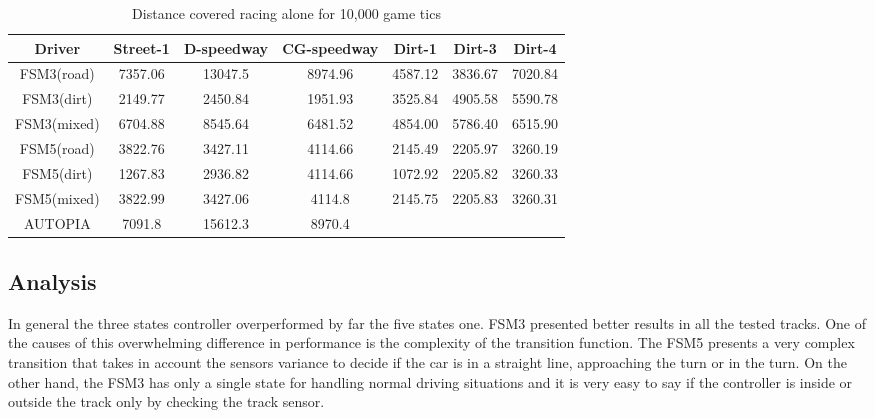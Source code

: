 	\begin{table}[h]
	\renewcommand{\arraystretch}{1.3}
	\caption{Distance covered racing alone for 10,000 game tics}
	\label{tbl:dist covered}
	\centering
	\begin{tabular}{c||c||c||c||c||c||c}
	\hline
	\bfseries Driver & \bfseries Street-1 & \bfseries D-speedway & \bfseries CG-speedway & \bfseries Dirt-1 & \bfseries Dirt-3 & \bfseries Dirt-4 \\ 
	\hline
	\hline FSM3(road) & 7357.06	& 13047.5 & 8974.96 & 4587.12 & 3836.67 & 7020.84 \\
	\hline FSM3(dirt) & 2149.77	& 2450.84 & 1951.93	& 3525.84 & 4905.58 & 5590.78 \\
	\hline FSM3(mixed) & 6704.88 & 8545.64 & 6481.52 & 4854.00 & 5786.40 & 6515.90 \\
	\hline FSM5(road) & 3822.76 & 3427.11 & 4114.66	& 2145.49 &	2205.97 & 3260.19 \\
	\hline FSM5(dirt) & 1267.83 & 2936.82 &	4114.66 & 1072.92 &	2205.82 & 3260.33 \\
	\hline FSM5(mixed) & 3822.99 & 3427.06 & 4114.8 & 2145.75 &	2205.83 & 3260.31 \\
	\hline AUTOPIA & 7091.8 & 15612.3 & 8970.4 & \toDo{?} &\toDo{?} &\toDo{?} \\
	\hline 
	\end{tabular} 
	\end{table}
	
	
\subsection{Analysis} \label{subsec:Analysis}
	
	In general the three states controller overperformed by far the five states one. FSM3 presented better results in all the tested tracks. One of the causes of this overwhelming difference in performance is the complexity of the transition function. The FSM5 presents a very complex transition that takes in account the sensors variance to decide if the car is in a straight line, approaching the turn or in the turn. On the other hand, the FSM3 has only a single state for handling normal driving situations and it is very easy to say if the controller is inside or outside the track only by checking the track sensor. 
	
	